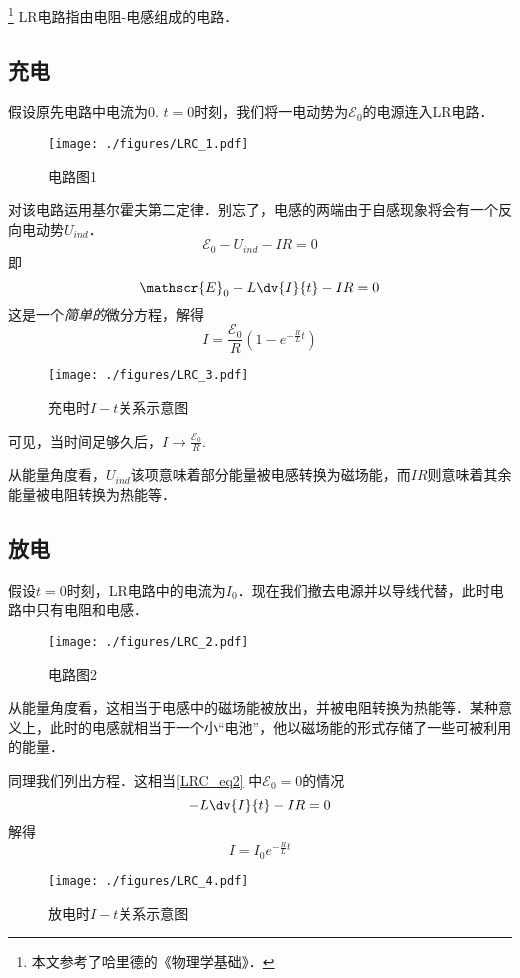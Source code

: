
\footnote{本文参考了哈里德的《物理学基础》．}
LR电路指由电阻-电感组成的电路．

\subsection{充电}
假设原先电路中电流为$0$. $t=0$时刻，我们将一电动势为$\mathscr{E}_0$的电源连入LR电路．
\begin{figure}[ht]
\centering
\texttt{[image: ./figures/LRC\_1.pdf]}
\caption{电路图1} \label{LRC_fig1}
\end{figure}

对该电路运用基尔霍夫第二定律．别忘了，电感的两端由于自感现象将会有一个反向电动势$U_{ind}$．
$$
\mathscr{E}_0 - U_{ind} - IR = 0
$$
即
\begin{equation}\label{LRC_eq2}
\mathscr{E}_0 - L\dv{I}{t} - IR = 0
\end{equation}
这是一个\textsl{简单的}微分方程，解得
\begin{equation}\label{LRC_eq1}
I = \frac{\mathscr{E}_0}{R} (1-e^{-\frac{R}{L}t})
\end{equation}

\begin{figure}[ht]
\centering
\texttt{[image: ./figures/LRC\_3.pdf]}
\caption{充电时$I-t$关系示意图} \label{LRC_fig3}
\end{figure}
可见，当时间足够久后，$I\to\frac{\mathscr{E_0}}{R}$.

从能量角度看，$U_{ind}$该项意味着部分能量被电感转换为磁场能，而$IR$则意味着其余能量被电阻转换为热能等．

\subsection{放电}
假设$t=0$时刻，LR电路中的电流为$I_0$．现在我们撤去电源并以导线代替，此时电路中只有电阻和电感．
\begin{figure}[ht]
\centering
\texttt{[image: ./figures/LRC\_2.pdf]}
\caption{电路图2} \label{LRC_fig2}
\end{figure}
从能量角度看，这相当于电感中的磁场能被放出，并被电阻转换为热能等．某种意义上，此时的电感就相当于一个小“电池”，他以磁场能的形式存储了一些可被利用的能量．

同理我们列出方程．这相当\autoref{LRC_eq2}  中$\mathscr{E}_0=0$的情况
\begin{equation}
- L\dv{I}{t} - IR = 0
\end{equation}
解得
\begin{equation}
I = I_0 e^{-\frac{R}{L}t}
\end{equation}
\begin{figure}[ht]
\centering
\texttt{[image: ./figures/LRC\_4.pdf]}
\caption{放电时$I-t$关系示意图} \label{LRC_fig4}
\end{figure}
